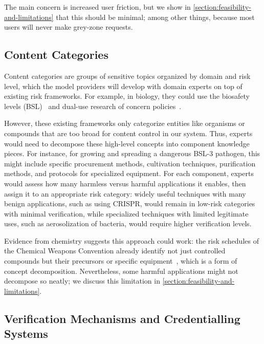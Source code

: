 \documentclass{article}
\theoremstyle{plain}
\theoremstyle{definition}
\theoremstyle{remark}
\begin{document}
The main concern is increased user friction, but we show in \cref{section:feasibility-and-limitations} that this should be minimal; among other things, because most users will never make grey-zone requests.


\subsection{Content Categories} \label{section:content-categories}

Content categories are groups of sensitive topics organized by domain and risk level, which the model providers will develop with domain experts on top of existing risk frameworks.
For example, in biology, they could use the biosafety levels (BSL)~\cite{CDC_BMBL_2020} and dual-use research of concern policies~\cite{USG_DURC_2012}.

However, these existing frameworks only categorize entities like organisms or compounds that are too broad for content control in our system.
Thus, experts would need to decompose these high-level concepts into component knowledge pieces.
For instance, for growing and spreading a dangerous BSL-3 pathogen, this might include specific procurement methods, cultivation techniques, purification methods, and protocols for specialized equipment.
For each component, experts would assess how many harmless versus harmful applications it enables, then assign it to an appropriate risk category: widely useful techniques with many benign applications, such as using CRISPR, would remain in low-risk categories with minimal verification, while specialized techniques with limited legitimate uses, such as aerosolization of bacteria, would require higher verification levels.

Evidence from chemistry suggests this approach could work: the risk schedules of the Chemical Weapons Convention already identify not just controlled compounds but their precursors or specific equipment~\cite{OPCW_CWC_1993}, which is a form of concept decomposition.
Nevertheless, some harmful applications might not decompose so neatly; we discuss this limitation in \cref{section:feasibility-and-limitations}.

\subsection{Verification Mechanisms and Credentialling Systems} \label{section:verification-mechanisms}
\end{document}
